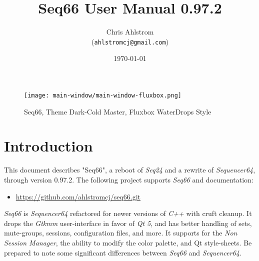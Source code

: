\documentclass[
 11pt,
 twoside,
 a4paper,
 final                                 %
]{article}
\begin{document}
\title{Seq66 User Manual 0.97.2}
\author{Chris Ahlstrom \\
   (\texttt{ahlstromcj@gmail.com})}
\date{\today}
\maketitle

\begin{figure}[H]
   \centering 
   \texttt{[image: main-window/main-window-fluxbox.png]}
   \caption*{Seq66, Theme Dark-Cold Master, Fluxbox WaterDrops Style}
\end{figure}

\clearpage                             %

\tableofcontents
\listoffigures                         %
\listoftables                          %


\setlength{\parindent}{2em}
\setlength{\parskip}{1ex plus 0.5ex minus 0.2ex}

\rhead{\rightmark}         %

\section{Introduction}
\label{sec:introduction}

   This document describes "Seq66", a reboot of \textsl{Seq24} and a rewrite of
   \textsl{Sequencer64}, through version 0.97.2.
   The following project supports \textsl{Seq66} and documentation:

   \begin{itemize}
      \item \url{https://github.com/ahlstromcj/seq66.git}
   \end{itemize}

   \textsl{Seq66} is \textsl{Sequencer64} refactored for newer versions of
   \textsl{C++} with cruft cleanup.  It drops the
   \textsl{Gtkmm} user-interface in favor of \textsl{Qt 5},
   and has better handling of sets, mute-groups, sessions, configuration files,
   and more.
   It supports for the \textsl{Non Session Manager}, the ability to
   modify the color palette, and Qt style-sheets.
   Be prepared to note some significant differences
   between \textsl{Seq66} and \textsl{Sequencer64}.
\end{document}
